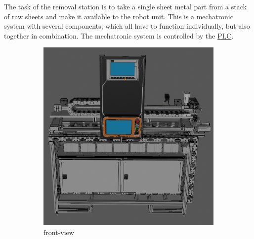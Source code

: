 The task of the removal station is to take a single sheet metal part from a stack of raw sheets and make it
available to the robot unit. This is a mechatronic system with several components, which all
have to function individually, but also together in combination. The mechatronic system is controlled by the \hyperref[acro:PLC]{PLC}.


\begin{figure}[h]
    \centering
    \begin{subfigure}{0.505\textwidth}
        \centering
        \includegraphics[width=\textwidth]{figures/unloading-station-front-blender.png} %
        \caption{front-view}
        \label{fig:unloading-station-front}
    \end{subfigure}\hfill
    \begin{subfigure}{0.45\textwidth}
        \centering

\end{subfigure}
\end{figure}

